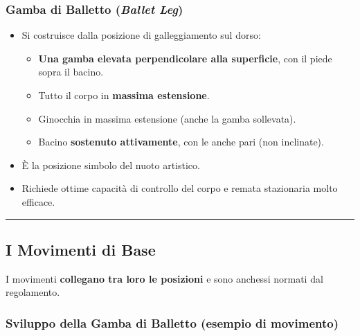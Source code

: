 \documentclass[a4paper,11pt]{article}
\providecommand{\tightlist}{%
  \setlength{\itemsep}{0pt}\setlength{\parskip}{0pt}}
\begin{document}
\subsubsection{\texorpdfstring{Gamba di Balletto (\emph{Ballet
                  Leg})}{Gamba di Balletto (Ballet Leg)}}\label{gamba-di-balletto-ballet-leg}

\begin{itemize}
      \tightlist
      \item
            Si costruisce dalla posizione di galleggiamento sul dorso:

            \begin{itemize}
                  \tightlist
                  \item
                        \textbf{Una gamba elevata perpendicolare alla superficie}, con il
                        piede sopra il bacino.
                  \item
                        Tutto il corpo in \textbf{massima estensione}.
                  \item
                        Ginocchia in massima estensione (anche la gamba sollevata).
                  \item
                        Bacino \textbf{sostenuto attivamente}, con le anche pari (non
                        inclinate).
            \end{itemize}
      \item
            È la posizione simbolo del nuoto artistico.
      \item
            Richiede ottime capacità di controllo del corpo e remata stazionaria
            molto efficace.
\end{itemize}

\begin{center}\rule{0.5\linewidth}{0.5pt}\end{center}

\subsection{I Movimenti di Base}\label{i-movimenti-di-base}

I movimenti \textbf{collegano tra loro le posizioni} e sono
anch\textquotesingle essi normati dal regolamento.

\subsubsection{Sviluppo della Gamba di Balletto (esempio di
      movimento)}\label{sviluppo-della-gamba-di-balletto-esempio-di-movimento}
\end{document}
